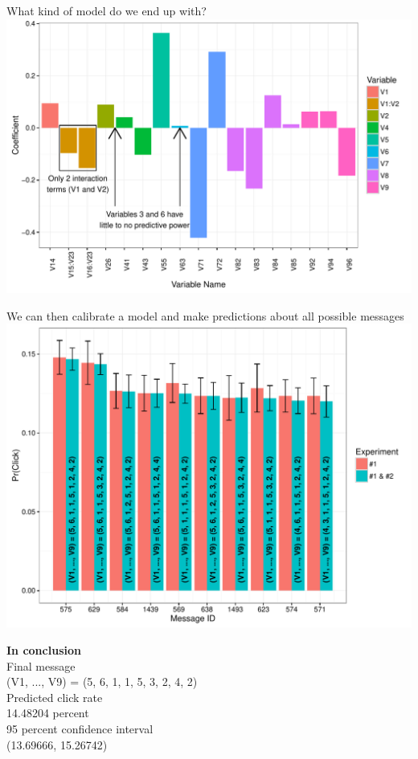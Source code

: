 \documentclass[11pt,xcolor=svgnames]{beamer}
\newcommand{\nv}{\color{Navy}}
\begin{document}
\begin{frame}
What kind of model do we end up with?
\includegraphics[width=\textwidth]{coef_all.pdf}
\end{frame}

\begin{frame}
We can then calibrate a model and make predictions about all possible messages
\includegraphics[width=\textwidth]{barplot.pdf}
\end{frame}

\begin{frame}
\textbf{\Large \nv In conclusion}\\
\vspace{0.2in}
Final message\\
(V1, ..., V9) = (5, 6, 1, 1, 5, 3, 2, 4, 2)\\
\vspace{0.2in}
Predicted click rate\\
14.48204 percent\\
\vspace{0.2in}
95 percent confidence interval\\
(13.69666, 15.26742)
\end{frame}
\end{document}

